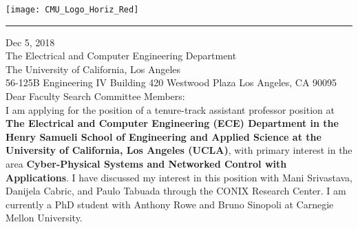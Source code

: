\documentclass[11mpt]{article}
\date{}
\begin{document}
\begin{minipage}[t!]{\textwidth}
\texttt{[image: CMU\_Logo\_Horiz\_Red]}\vspace{-10pt}\\
\noindent\rule{\textwidth}{0.5pt}
\end{minipage}


\vspace{10pt}



Dec 5, 2018\\

The Electrical and Computer Engineering Department\\
The University of California, Los Angeles\\
56-125B Engineering IV Building
420 Westwood Plaza 
Los Angeles, CA 90095\\




Dear Faculty Search Committee Members:\\


I am applying for the position of a tenure-track assistant professor position at \textbf{The Electrical and Computer Engineering (ECE) Department in the Henry Samueli School of Engineering and Applied Science at the University of California, Los Angeles (UCLA)}, with primary interest in the area \textbf{Cyber-Physical Systems and Networked Control with Applications}. I have discussed my interest in this position with Mani Srivastava, Danijela Cabric, and Paulo Tabuada through the CONIX Research Center. %
I am currently a PhD student with Anthony Rowe and Bruno Sinopoli at Carnegie Mellon University.\\ %
\end{document}
